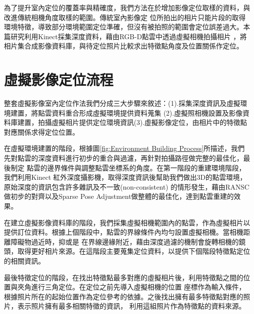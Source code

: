 

	為了提升室內定位的覆蓋率與精確度，我們方法在於增加影像定位取樣的資料，與改進傳統相機角度取樣的範圍。傳統室內影像定
位所拍出的相片只能片段的取得環境特徵，導致部分環境範圍定位準確，但沒有被拍照的範圍會定位誤差過大。本篇研究利用Kinect採集深度資料，藉由RGB-D點雲中透過虛擬相機拍攝相片
，將相片集合成影像資料庫，與待定位照片比較求出特徵點角度及位置關係作定位。

\section{虛擬影像定位流程}

	整套虛擬影像室內定位作法我們分成三大步驟來敘述：(1).採集深度資訊及虛擬環境建置，將點雲資料重合形成虛擬環境提供資料蒐集
(2).虛擬照相機設置及影像資料庫建置，拍攝虛擬相片提供定位環境資訊(3).虛擬影像定位，由相片中的特徵點對應關係求得定位位置。
	
	在虛擬環境建置的階段，根據圖\ref{fig:Environment Building Process}所描述，我們先對點雲的深度資料進行初步的重合與過濾，再針對拍攝路徑做完整的最佳化，最後制定
點雲的邊界條件與調整點雲坐標系的角度。在第一階段的重建環境階段，我們利用Kinect 紅外深度攝影機，取得深度資訊後幫助我們做出3D的點雲環境，原始深度的資訊包含許多雜訊及不一致(non-consistent)
的情形發生，藉由RANSC做初步的對齊以及Sparse Pose Adjustment做整體的最佳化，達到點雲重建的效果。

	在建立虛擬影像資料庫的階段，我們採集虛擬相機範圍內的點雲，作為虛擬相片以提供訂位資料。根據上個階段中，點雲的界線條件內均勻設置虛擬相機。當相機距離障礙物過近時，抑或是
在界線邊緣附近，藉由深度過濾的機制會旋轉相機的鏡頭，取得更好相片來源。在這階段主要蒐集定位資料，以提供下個階段特徵點定位的相關資訊。

	最後特徵定位的階段，在找出特徵點最多對應的虛擬相片後，利用特徵點之間的位置與夾角進行三角定位。在定位之前先導入虛擬相機的位置
座標作為輸入條件，根據照片所在的起始位置作為定位參考的依據。之後找出擁有最多特徵點對應的照片，表示照片擁有最多相關特徵的資訊，
利用這組照片作為特徵點的資料來源。


